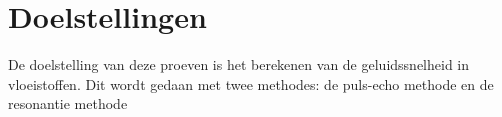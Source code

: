 \section{Doelstellingen}

De doelstelling van deze proeven is het berekenen van de geluidssnelheid in 
vloeistoffen. Dit wordt gedaan met twee methodes: de puls-echo methode en de 
resonantie methode

